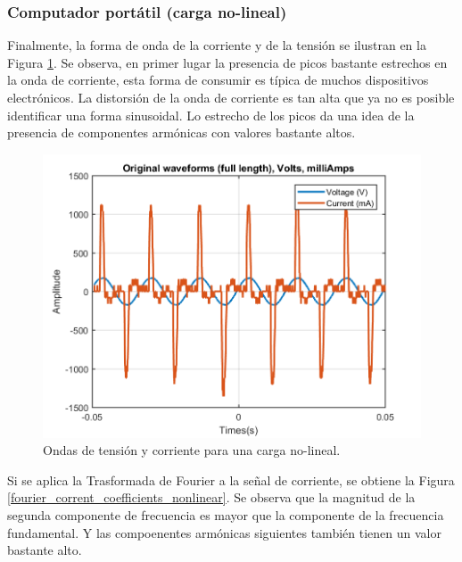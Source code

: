 \documentclass[journal]{IEEEtran}
\begin{document}
\subsubsection{Computador portátil (carga no-lineal)} 
Finalmente,  la forma de onda de la corriente y de la 
tensión se ilustran en la Figura 
\ref{original_no_lineal_load}. Se observa, en primer lugar
la presencia de picos bastante estrechos en la onda  
de corriente, esta forma de consumir 
es típica de muchos dispositivos electrónicos. 
La distorsión de la onda de corriente es tan alta que ya 
no es posible identificar una forma sinusoidal. 
Lo estrecho de los picos da una idea de la presencia de 
componentes armónicas con valores bastante altos. 


\begin{figure}[h]
\centering
\includegraphics[clip,width=0.9\columnwidth]
{original_waveform_computer.png}
\caption{Ondas de tensión y corriente para una carga
no-lineal.}
\label{original_no_lineal_load}
\end{figure}

Si se aplica la Trasformada de Fourier a la señal de 
corriente, se obtiene la Figura 
\ref{fourier_corrent_coefficients_nonlinear}. Se observa
que la magnitud de la segunda componente de frecuencia 
es mayor que la componente de la frecuencia fundamental. 
Y las compoenentes armónicas siguientes 
también tienen un valor bastante alto. \\
\end{document}
